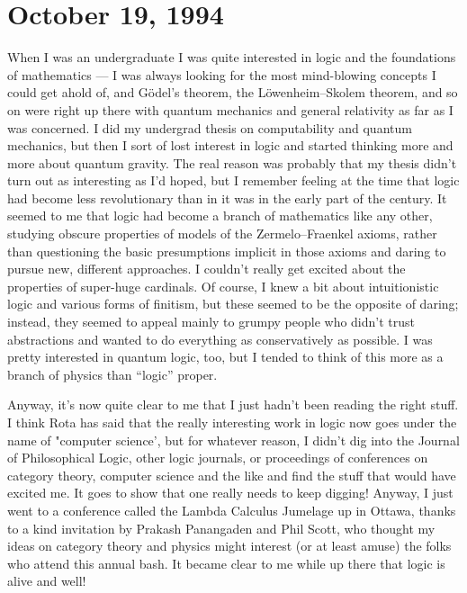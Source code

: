 \documentclass{article}
\begin{document}
\hypertarget{week40}{%
\section{October 19, 1994}\label{week40}}

When I was an undergraduate I was quite interested in logic and the
foundations of mathematics --- I was always looking for the most
mind-blowing concepts I could get ahold of, and G\"odel's theorem, the
L\"owenheim--Skolem theorem, and so on were right up there with quantum
mechanics and general relativity as far as I was concerned. I did my
undergrad thesis on computability and quantum mechanics, but then I sort
of lost interest in logic and started thinking more and more about
quantum gravity. The real reason was probably that my thesis didn't turn
out as interesting as I'd hoped, but I remember feeling at the time that
logic had become less revolutionary than in it was in the early part of
the century. It seemed to me that logic had become a branch of
mathematics like any other, studying obscure properties of models of the
Zermelo--Fraenkel axioms, rather than questioning the basic presumptions
implicit in those axioms and daring to pursue new, different approaches.
I couldn't really get excited about the properties of super-huge
cardinals. Of course, I knew a bit about intuitionistic logic and
various forms of finitism, but these seemed to be the opposite of
daring; instead, they seemed to appeal mainly to grumpy people who
didn't trust abstractions and wanted to do everything as conservatively
as possible. I was pretty interested in quantum logic, too, but I tended
to think of this more as a branch of physics than ``logic'' proper.

Anyway, it's now quite clear to me that I just hadn't been reading the
right stuff. I think Rota has said that the really interesting work in
logic now goes under the name of "computer science', but for whatever
reason, I didn't dig into the Journal of Philosophical Logic, other
logic journals, or proceedings of conferences on category theory,
computer science and the like and find the stuff that would have excited
me. It goes to show that one really needs to keep digging! Anyway, I
just went to a conference called the Lambda Calculus Jumelage up in
Ottawa, thanks to a kind invitation by Prakash Panangaden and Phil
Scott, who thought my ideas on category theory and physics might
interest (or at least amuse) the folks who attend this annual bash. It
became clear to me while up there that logic is alive and well!
\end{document}
